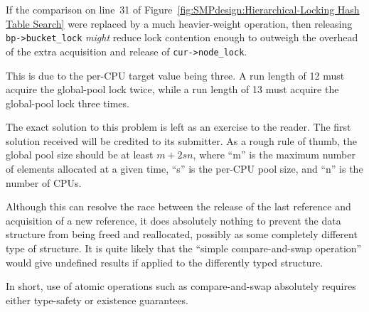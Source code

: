 
	If the comparison on line~31 of
	Figure~\ref{fig:SMPdesign:Hierarchical-Locking Hash Table Search}
	were replaced by a much heavier-weight operation,
	then releasing {\tt bp->bucket\_lock} \emph{might} reduce lock
	contention enough to outweigh the overhead of the extra
	acquisition and release of {\tt cur->node\_lock}.


	This is due to the per-CPU target value being three.
	A run length of 12 must acquire the global-pool lock twice,
	while a run length of 13 must acquire the global-pool lock
	three times.


	The exact solution to this problem is left as an exercise to
	the reader.
	The first solution received will be credited to its submitter.
	As a rough rule of thumb, the global pool size should be at least
	$m+2sn$, where
	``m'' is the maximum number of elements allocated at a given time,
	``s'' is the per-CPU pool size,
	and ``n'' is the number of CPUs.


	Although this can resolve the race between the release of
	the last reference and acquisition of a new reference,
	it does absolutely nothing to prevent the data structure
	from being freed and reallocated, possibly as some completely
	different type of structure.
	It is quite likely that the ``simple compare-and-swap
	operation'' would give undefined results if applied to the
	differently typed structure.

	In short, use of atomic operations such as compare-and-swap
	absolutely requires either type-safety or existence guarantees.


